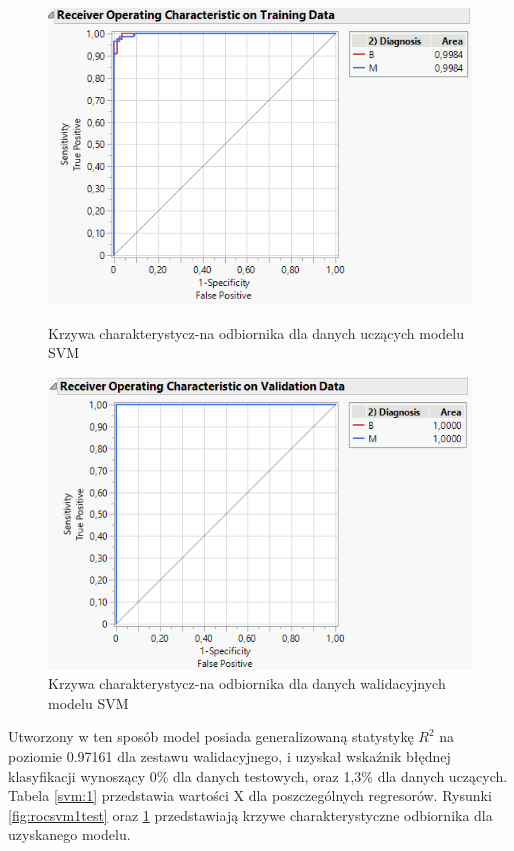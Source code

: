 \begin{figure}[!ht]
	\begin{minipage}{0.48\textwidth}
		\centering
		\includegraphics[width=0.98\linewidth]{Rysunki/Rozdzial3/roc_svm1_test}
		\caption{Krzywa charakterystycz-na odbiornika dla danych uczących modelu SVM}
		\label{fig:rocsvm1test}		
	\end{minipage}%
	\hspace{10pt}
	\begin{minipage}{0.48\textwidth}
		\centering
		\includegraphics[width=0.98\linewidth]{Rysunki/Rozdzial3/roc_svm1_val}
		\caption{Krzywa charakterystycz-na odbiornika dla danych walidacyjnych modelu SVM}
		\label{fig:rocsvm1val}				
	\end{minipage}	
\end{figure}

Utworzony w ten sposób model posiada generalizowaną statystykę $R^{2}$ na poziomie 0.97161 dla zestawu walidacyjnego, i uzyskał wskaźnik błędnej klasyfikacji wynoszący 0\% dla danych testowych, oraz 1,3\% dla danych uczących. Tabela \ref{svm:1} przedstawia wartości X dla poszczególnych regresorów. Rysunki \ref{fig:rocsvm1test} oraz \ref{fig:rocsvm1val} przedstawiają krzywe charakterystyczne odbiornika dla uzyskanego modelu.

